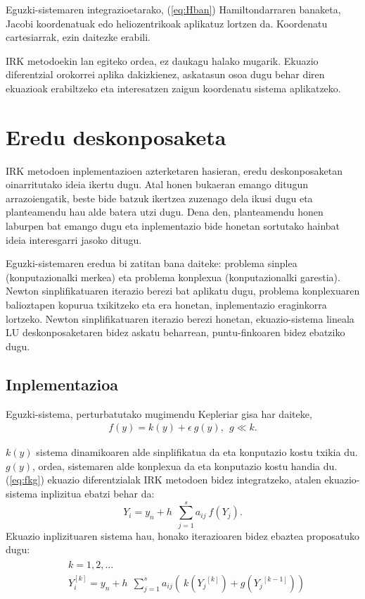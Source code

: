 Eguzki-sistemaren integrazioetarako, (\ref{eq:Hban}) Hamiltondarraren banaketa, Jacobi koordenatuak edo heliozentrikoak aplikatuz lortzen da.
Koordenatu cartesiarrak, ezin daitezke erabili.

IRK metodoekin lan egiteko ordea, ez daukagu halako mugarik. Ekuazio diferentzial orokorrei aplika dakizkienez, askatasun osoa dugu behar diren ekuazioak erabiltzeko eta interesatzen zaigun koordenatu sistema aplikatzeko.  


\section{Eredu deskonposaketa}


IRK metodoen inplementazioen azterketaren hasieran, eredu deskonposaketan oinarritutako ideia ikertu dugu. Atal honen bukaeran emango ditugun arrazoiengatik, beste bide batzuk ikertzea zuzenago dela ikusi dugu eta planteamendu hau alde batera utzi dugu. Dena den, planteamendu honen laburpen bat emango dugu eta inplementazio bide honetan sortutako hainbat ideia interesgarri jasoko ditugu.

Eguzki-sistemaren eredua bi zatitan bana daiteke: problema sinplea (konputazionalki merkea) eta problema konplexua (konputazionalki garestia). Newton sinplifikatuaren iterazio berezi bat aplikatu dugu, problema konplexuaren balioztapen kopurua txikitzeko eta era honetan, inplementazio eraginkorra lortzeko. Newton sinplifikatuaren iterazio berezi honetan, ekuazio-sistema lineala LU deskonposaketaren bidez askatu beharrean, puntu-finkoaren bidez ebatziko dugu.


\subsection*{Inplementazioa}
Eguzki-sistema, perturbatutako mugimendu Kepleriar gisa har daiteke,  
\begin{align}
\label{eq:fkg}
 f(y)=  k(y) + \epsilon \ g (y), \ \ g\ll k.   
\end{align}
 
$k(y)$ sistema dinamikoaren alde sinplifikatua da eta konputazio kostu txikia du. $g(y)$, ordea, sistemaren alde konplexua da eta konputazio kostu handia du. (\ref{eq:fkg}) ekuazio diferentzialak IRK metodoen bidez integratzeko, atalen ekuazio-sistema inplizitua ebatzi behar da: 
\begin{equation*}
Y_i=y_n+h\ \ \sum^s_{j=1}{a_{ij} \ f({Y_j}) }. 
\end{equation*} 
%
Ekuazio inplizituaren sistema hau, honako iterazioaren bidez ebaztea proposatuko dugu:
\begin{align}
\begin{split}
&k=1,2,\dots \\
&Y_i^{[k]}=y_n+h\ \ \sum^s_{j=1}{a_{ij}(\ k({Y_j}^{[k]})+g({Y_j}^{[k-1]})) }
\end{split}
\end{align}

